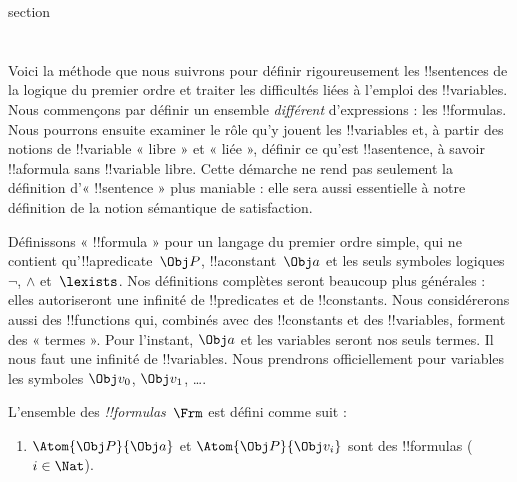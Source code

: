 \documentclass[11pt,a4paper,openany]{memoir}
\begin{document}
\endgroup



\begingroup
\expandafter\def\csname ol@sectioncs\endcsname{section}
\def\olfilename{formulas}



\section{}

Voici la méthode que nous suivrons pour définir rigoureusement les
!!{sentence}s de la logique du premier ordre et traiter les difficultés
liées à l'emploi des !!{variable}s. Nous commençons par définir un
ensemble \emph{différent} d'expressions : les !!{formula}s. Nous
pourrons ensuite examiner le rôle qu'y jouent les !!{variable}s et, à
partir des notions de !!{variable} « libre » et « liée », définir ce
qu'est !!a{sentence}, à savoir !!a{formula} sans !!{variable} libre.
Cette démarche ne rend pas seulement la définition d'« !!{sentence} »
plus maniable : elle sera aussi essentielle à notre définition de la
notion sémantique de satisfaction.

Définissons « !!{formula} » pour un langage du premier ordre simple,
qui ne contient qu'!!a{predicate}~$\Obj P$, !!a{constant}~$\Obj a$ et
les seuls symboles logiques $\lnot$, $\land$ et~$\lexists$. Nos
définitions complètes seront beaucoup plus générales : elles
autoriseront une infinité de !!{predicate}s et de !!{constant}s. Nous
considérerons aussi des !!{function}s qui, combinés avec des
!!{constant}s et des !!{variable}s, forment des « termes ». Pour
l'instant, $\Obj a$ et les variables seront nos seuls termes. Il nous
faut une infinité de !!{variable}s. Nous prendrons officiellement pour
variables les symboles $\Obj v_0$, $\Obj v_1$, \dots.

\begin{defn}
L'ensemble des \emph{!!{formula}s}~$\Frm$ est défini comme suit :
\begin{enumerate}
\item{} $\Atom{\Obj P}{\Obj a}$ et
  $\Atom{\Obj P}{\Obj v_i}$ sont des !!{formula}s ($i \in \Nat$).




\end{enumerate}
\end{defn}
\end{document}
